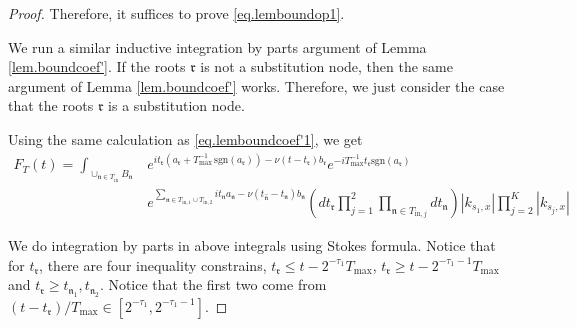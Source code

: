 \begin{proof}
Therefore, it suffices to prove \eqref{eq.lemboundop1}.

We run a similar inductive integration by parts argument of Lemma \ref{lem.boundcoef'}. If the roots $\mathfrak{r}$ is not a substitution node, then the same argument of Lemma \ref{lem.boundcoef'} works. Therefore, we just consider the case that the roots $\mathfrak{r}$ is a substitution node. 

Using the same calculation as \eqref{eq.lemboundcoef'1}, we get 
\begin{equation}
\begin{split}
    F_{T}(t)=\int_{\cup_{\mathfrak{n}\in T_{\text{in}}} B_{\mathfrak{n}}}&e^{it_{\mathfrak{r}}(a_{\mathfrak{r}}+T^{-1}_{\text{max}}\, \text{sgn}(a_{\mathfrak{r}}))- \nu(t-t_{\mathfrak{r}})b_{\mathfrak{r}}} e^{-iT^{-1}_{\text{max}}t_{\mathfrak{r}} \text{sgn}(a_{\mathfrak{r}})} 
    \\
    &e^{\sum_{\mathfrak{n}\in T_{\text{in},1}\cup T_{\text{in},2}} it_{\mathfrak{n}} a_{\mathfrak{n}} - \nu(t_{\widehat{\mathfrak{n}}}-t_{\mathfrak{n}})b_{\mathfrak{n}}}  \left(dt_{\mathfrak{r}}\prod_{j=1}^2\prod_{\mathfrak{n}\in T_{\text{in},j}}dt_{\mathfrak{n}}  \right)|k_{s_1,x}|\prod^K_{j=2}|k_{s_j,x}|
\end{split}
\end{equation}



We do integration by parts in above integrals using Stokes formula. Notice that for $t_{\mathfrak{r}}$, there are four inequality constrains, $t_{\mathfrak{r}}\le t-2^{-\tau_{1}}T_{\text{max}}$, $t_{\mathfrak{r}}\ge t-2^{-\tau_{1}-1}T_{\text{max}}$ and $t_{\mathfrak{r}}\ge t_{\mathfrak{n}_1},t_{\mathfrak{n}_2}$. Notice that the first two come from $(t-t_{\mathfrak{r}})/T_{\text{max}}\in [2^{-\tau_{1}},2^{-\tau_{1}-1}]$.



\end{proof}
